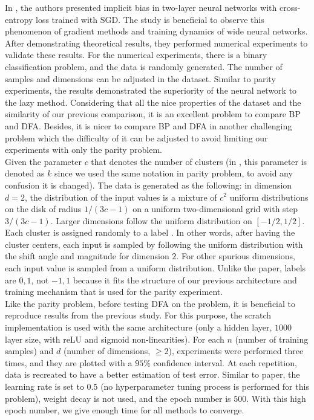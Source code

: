 \documentclass[a4paper, nobind]{templates/ociamthesis}
\begin{document}
In \cite{chizat2020implicit}, the authors presented implicit bias in two-layer neural networks with cross-entropy loss trained with SGD. The study is beneficial to observe this phenomenon of gradient methods and training dynamics of wide neural networks. After demonstrating theoretical results, they performed numerical experiments to validate these results. For the numerical experiments, there is a binary classification problem, and the data is randomly generated. The number of samples and dimensions can be adjusted in the dataset. Similar to parity experiments, the results demonstrated the superiority of the neural network to the lazy method. Considering that all the nice properties of the dataset and the similarity of our previous comparison, it is an excellent problem to compare BP and DFA. Besides, it is nicer to compare BP and DFA in another challenging problem which the difficulty of it can be adjusted to avoid limiting our experiments with only the parity problem.\\
\noindent Given the parameter \(c\) that denotes the number of clusters (in \cite{chizat2020implicit}, this parameter is denoted as \(k\) since we used the same notation in parity problem, to avoid any confusion it is changed). The data is generated as the following: in dimension \(d=2\), the distribution of the input values is a mixture of \(c^2\) uniform distributions on the disk of radius \(1/ (3c-1)\) on a uniform two-dimensional grid with step \(3/(3c-1)\). Larger dimensions follow the uniform distribution on \([-1/2,1/2]\). Each cluster is assigned randomly to a label \cite{chizat2020implicit}. In other words, after having the cluster centers, each input is sampled by following the uniform distribution with the shift angle and magnitude for dimension \(2\). For other spurious dimensions, each input value is sampled from a uniform distribution. Unlike the paper, labels are \(0,1\), not \(-1,1\) because it fits the structure of our previous architecture and training mechanism that is used for the parity experiment.\\
Like the parity problem, before testing DFA on the problem, it is beneficial to reproduce results from the previous study. For this purpose, the scratch implementation is used with the same architecture (only a hidden layer, \(1000\) layer size, with reLU and sigmoid non-linearities). For each \(n\) (number of training samples) and \(d\) (number of dimensions, \(\geq2\)), experiments were performed three times, and they are plotted with a \(95\%\) confidence interval. At each repetition, data is recreated to have a better estimation of test error. Similar to paper, the learning rate is set to \(0.5\) (no hyperparameter tuning process is performed for this problem), weight decay is not used, and the epoch number is \(500\). With this high epoch number, we give enough time for all methods to converge.
\end{document}
